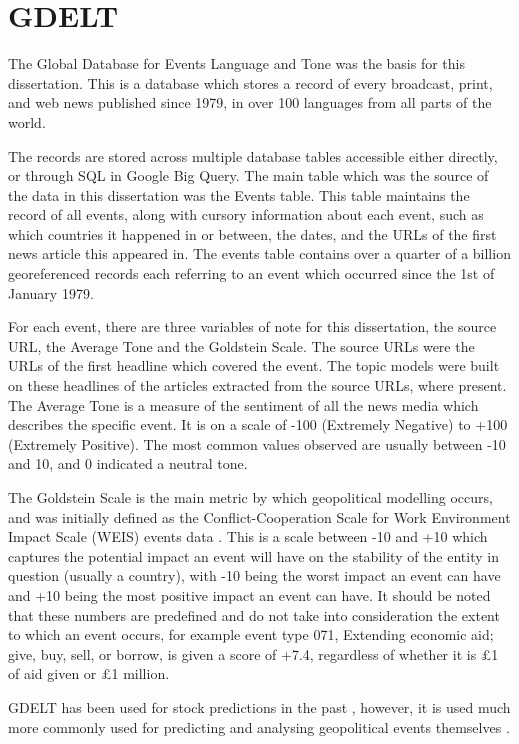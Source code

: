 \section{GDELT}
\label{gdelt}

The Global Database for Events Language and Tone was the basis for this dissertation. This is a database which stores a record of every broadcast, print, and web news published since 1979, in over 100 languages from all parts of the world. 

The records are stored across multiple database tables accessible either directly, or through SQL in Google Big Query. The main table which was the source of the data in this dissertation was the Events table. This table maintains the record of all events, along with cursory information about each event, such as which countries it happened in or between, the dates, and the URLs of the first news article this appeared in. The events table contains over a quarter of a billion georeferenced records each referring to an event which occurred since the 1st of January 1979. 

For each event, there are three variables of note for this dissertation, the source URL, the Average Tone and the Goldstein Scale. The source URLs were the URLs of the first headline which covered the event. The topic models were built on these headlines of the articles extracted from the source URLs, where present. The Average Tone is a measure of the sentiment of all the news media which describes the specific event. It is on a scale of -100 (Extremely Negative) to +100 (Extremely Positive). The most common values observed are usually between -10 and 10, and 0 indicated a neutral tone. 

The Goldstein Scale is the main metric by which geopolitical modelling occurs, and was initially defined as the Conflict-Cooperation Scale for Work Environment Impact Scale (WEIS) events data \cite{goldstein1992conflict}. This is a scale between -10 and +10 which captures the potential impact an event will have on the stability of the entity in question (usually a country), with -10 being the worst impact an event can have and +10 being the most positive impact an event can have. It should be noted that these numbers are predefined and do not take into consideration the extent to which an event occurs, for example event type 071, Extending economic aid; give, buy, sell, or borrow, is given a score of +7.4, regardless of whether it is £1 of aid given or £1 million. 

GDELT has been used for stock predictions in the past \cite{memari2017predicting} \cite{alamro2019predicting}, however, it is used much more commonly used for predicting and analysing geopolitical events themselves \cite{qiao2017predicting} \cite{yonamine2013predicting}. 